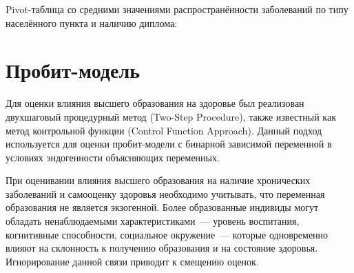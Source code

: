 \documentclass[a4paper,12pt]{article}
\begin{document}
Pivot-таблица со средними значениями распространённости заболеваний по типу населённого пункта и наличию диплома:
\begin{table}[H]
\centering
\caption{Доля заболевших по типу населённого пункта и наличию диплома}
\end{table}
\section{Пробит-модель}
Для оценки влияния высшего образования на здоровье был реализован двухшаговый процедурный метод
(Two-Step Procedure), также известный как метод контрольной функции (Control Function Approach).
Данный подход используется для оценки пробит-модели с бинарной зависимой переменной в условиях эндогенности объясняющих переменных.

При оценивании влияния высшего образования на наличие хронических заболеваний и самооценку здоровья
необходимо учитывать, что переменная образования не является экзогенной.
Более образованные индивиды могут обладать ненаблюдаемыми характеристиками~--- уровень воспитания, когнитивные способности, социальное окружение~---
которые одновременно влияют на склонность к получению образования и на состояние здоровья.
Игнорирование данной связи приводит к смещению оценок.
\end{document}

